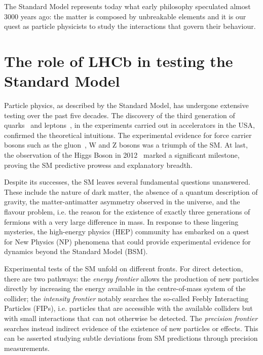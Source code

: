 The Standard Model represents today what early philosophy speculated almost 3000 years ago: the matter is composed by unbreakable elements and it is our quest as particle physicists to study the interactions that govern their behaviour.


\section{The role of LHCb in testing the Standard Model}
Particle physics, as described by the Standard Model, has undergone extensive testing over the past five decades. The discovery of the third generation of quarks~\cite{E288:1977xhf, CDF:1995wbb} and leptons~\cite{PhysRevLett.35.1489}, in the experiments carried out in accelerators in the USA, confirmed the theoretical intuitions. The experimental evidence for force carrier bosons such as the gluon~\cite{BERGER1979449}, W and Z bosons \cite{UA1:1983mne, UA2:1983mlz} was a triumph of the SM. At last, the  observation of the Higgs Boson in 2012~\cite{Aad_2012, Chatrchyan_2012} marked a significant milestone, proving the SM predictive prowess and explanatory breadth. 

Despite its successes, the SM leaves several fundamental questions unanswered. These include the nature of dark matter, the absence of a quantum description of gravity, the matter-antimatter asymmetry observed in the universe, and the flavour problem, i.e. the reason for the existence of exactly three generations of fermions with a very large difference in mass. In response to these lingering mysteries, the high-energy physics (HEP) community has embarked on a quest for New Physics (NP) phenomena that could provide experimental evidence for dynamics beyond the Standard Model (BSM). 


Experimental tests of the SM unfold on different fronts.
For direct detection, there are two pathways: 
the \textit{energy frontier} allows the production of new particles directly by increasing the energy available in the centre-of-mass system of the collider; the \textit{intensity frontier} notably searches the so-called Feebly Interacting Particles (FIPs), i.e. particles that are accessible with the available colliders but with small interactions that can not otherwise be detected.  
The \textit{precision frontier} searches instead indirect evidence of the existence of new particles or effects. This can be asserted studying subtle deviations from SM predictions through precision measurements. 

